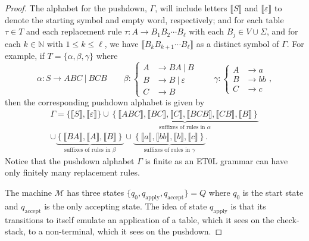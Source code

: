\begin{proof}
	The alphabet for the pushdown, $\Gamma$, will include letters $\llbracket S \rrbracket$ and $\llbracket \varepsilon \rrbracket$ to denote the starting symbol and empty word, respectively; and for each table $\tau \in T$ and each replacement rule $\tau\colon A \to B_1 B_2 \cdots B_\ell$ with each $B_j \in V \cup \Sigma$, and for each $k \in \mathbb{N}$ with $1 \leq k \leq \ell$, we have $\llbracket B_k B_{k+1} \cdots B_\ell \rrbracket$ as a distinct symbol of $\Gamma$.
	For example, if $T = \{\alpha, \beta, \gamma\}$ where
	\[
	\alpha \colon
	S \to ABC \ \vert \ BCB
	\qquad
	\beta \colon
	\left\{
	\begin{aligned}
		A &\to BA \ \vert \ B \\
		B &\to B\ \vert\ \varepsilon \\
		C &\to B
	\end{aligned}
	\right.
	\qquad
	\gamma \colon
	\left\{
	\begin{aligned}
		A &\to a \\
		B &\to bb\\
		C &\to c
	\end{aligned}
	\right.,
	\]
	then the corresponding pushdown alphabet is given by
	\begin{multline*}
		\Gamma
		=
		\{ \llbracket S \rrbracket, \llbracket \varepsilon \rrbracket \}
		\cup
		\underbrace{
			\left\{
			\llbracket ABC \rrbracket,
			\llbracket BC \rrbracket,
			\llbracket C \rrbracket,
			\llbracket BCB \rrbracket,
			\llbracket CB \rrbracket,
			\llbracket B \rrbracket
			\right\}
		}_{\text{suffixes of rules in }\alpha}
		\\
		\cup
		\underbrace{
			\left\{
			\llbracket BA \rrbracket,
			\llbracket A \rrbracket,
			\llbracket B \rrbracket
			\right\}
		}_{\text{suffixes of rules in }\beta}
		\cup
		\underbrace{
			\left\{
			\llbracket a \rrbracket,
			\llbracket bb \rrbracket,
			\llbracket b \rrbracket,
			\llbracket c \rrbracket
			\right\}
		}_{\text{suffixes of rules in }\gamma}.
	\end{multline*}
	Notice that the pushdown alphabet $\Gamma$ is finite as an ET0L grammar can have only finitely many replacement rules.
	
	The machine $\mathcal{M}$ has three states $\{ q_0, q_\mathrm{apply}, q_\mathrm{accept}\} = Q$ where $q_0$ is the start state and $q_\mathrm{accept}$ is the only accepting state.
	The idea of state $q_\mathrm{apply}$ is that its transitions to itself emulate an application of a table, which it sees on the check-stack, to a non-terminal, which it sees on the pushdown.
	

\end{proof}
